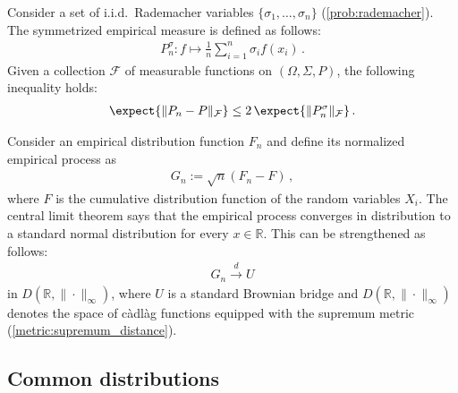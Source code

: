     \begin{property}
        Consider a set of i.i.d.~Rademacher variables $\{\sigma_1,\ldots,\sigma_n\}$ (\cref{prob:rademacher}). The symmetrized empirical measure is defined as follows:
        \begin{gather}
            P^\sigma_n:f\mapsto\frac{1}{n}\sum_{i=1}^n\sigma_if(x_i)\,.
        \end{gather}
        Given a collection $\mathcal{F}$ of measurable functions on $(\Omega,\Sigma,P)$, the following inequality holds:
        \begin{gather}
            \expect{\|P_n-P\|_{\mathcal{F}}}\leq2\,\expect{\|P^\sigma_n\|_{\mathcal{F}}}\,.
        \end{gather}
    \end{property}

    \begin{theorem}[Donsker]
        Consider an empirical distribution function $F_n$ and define its normalized empirical process as
        \begin{gather}
            G_n := \sqrt{n}(F_n-F)\,,
        \end{gather}
        where $F$ is the cumulative distribution function of the random variables $X_i$. The central limit theorem says that the empirical process converges in distribution to a standard normal distribution for every $x\in\mathbb{R}$. This can be strengthened as follows:
        \begin{gather}
            G_n\overset{d}{\longrightarrow}U
        \end{gather}
        in $D(\mathbb{R},\|\cdot\|_\infty)$, where $U$ is a standard Brownian bridge and $D(\mathbb{R},\|\cdot\|_\infty)$ denotes the space of c\`adl\`ag functions equipped with the supremum metric (\cref{metric:supremum_distance}).
    \end{theorem}

\subsection{Common distributions}



